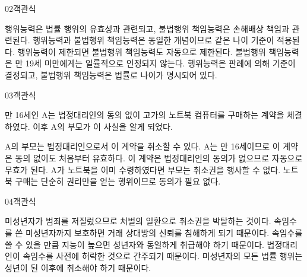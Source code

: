 \documentclass[fs85,seriesWit]{korfarm-base}
\begin{document}
\begin{kfQBlock}{02}{객관식}
\begin{kfChoices}
\kfChoice 행위능력은 법률 행위의 유효성과 관련되고, 불법행위 책임능력은 손해배상 책임과 관련된다.
\kfChoice 행위능력과 불법행위 책임능력은 동일한 개념이므로 같은 나이 기준이 적용된다.
\kfChoice 행위능력이 제한되면 불법행위 책임능력도 자동으로 제한된다.
\kfChoice 불법행위 책임능력은 만 19세 미만에게는 일률적으로 인정되지 않는다.
\kfChoice 행위능력은 판례에 의해 기준이 결정되고, 불법행위 책임능력은 법률로 나이가 명시되어 있다.
\end{kfChoices}
\end{kfQBlock}

\begin{kfQBlock}{03}{객관식}
\begin{kfEvidence}만 16세인 A는 법정대리인의 동의 없이 고가의 노트북 컴퓨터를 구매하는 계약을 체결하였다. 이후 A의 부모가 이 사실을 알게 되었다.\end{kfEvidence}
\begin{kfChoices}
\kfChoice A의 부모는 법정대리인으로서 이 계약을 취소할 수 있다.
\kfChoice A는 만 16세이므로 이 계약은 동의 없이도 처음부터 유효하다.
\kfChoice 이 계약은 법정대리인의 동의가 없으므로 자동으로 무효가 된다.
\kfChoice A가 노트북을 이미 수령하였다면 부모는 취소권을 행사할 수 없다.
\kfChoice 노트북 구매는 단순히 권리만을 얻는 행위이므로 동의가 필요 없다.
\end{kfChoices}
\end{kfQBlock}

\begin{kfQBlock}{04}{객관식}
\begin{kfChoices}
\kfChoice 미성년자가 범죄를 저질렀으므로 처벌의 일환으로 취소권을 박탈하는 것이다.
\kfChoice 속임수를 쓴 미성년자까지 보호하면 거래 상대방의 신뢰를 침해하게 되기 때문이다.
\kfChoice 속임수를 쓸 수 있을 만큼 지능이 높으면 성년자와 동일하게 취급해야 하기 때문이다.
\kfChoice 법정대리인이 속임수를 사전에 허락한 것으로 간주되기 때문이다.
\kfChoice 미성년자의 모든 법률 행위는 성년이 된 이후에 취소해야 하기 때문이다.
\end{kfChoices}
\end{kfQBlock}

\kfEndMC
\end{document}
